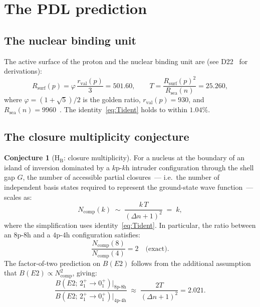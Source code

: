 \documentclass[11pt,a4paper]{article}
\theoremstyle{definition}
\newtheorem{conjecture}[theorem]{Conjecture}
\newcommand{\Rsurf}{R_{\mathrm{surf}}}
\newcommand{\Rsea}{R_{\mathrm{sea}}}
\newcommand{\rval}{r_{\mathrm{val}}}
\newcommand{\Dn}{\Delta n}
\newcommand{\Ncomp}{N_{\mathrm{comp}}}
\newcommand{\BE}[1]{B(E2;\,{2^+_1}\!\to\!{0^+_1})\big|_{#1}}
\newcommand{\Tpdl}{T}
\newcommand{\kph}{k\text{p-}k\text{h}}
\begin{document}
\section{The PDL prediction}
\label{sec:prediction}

\subsection{The nuclear binding unit}

The active surface of the proton and the nuclear binding unit are
(see D22~\cite{PDL_D22_2026} for derivations):
\begin{equation}
  \Rsurf(p) = \varphi\,\frac{\rval(p)}{3} = 501.60,
  \qquad
  \Tpdl = \frac{\Rsurf(p)^2}{\Rsea(n)} = 25.260,
  \label{eq:T}
\end{equation}
where $\varphi = (1+\sqrt{5})/2$ is the golden ratio, $\rval(p) = 930$, and
$\Rsea(n) = 9960$~\cite{PDL_D05_2026}. The identity~\eqref{eq:Tident}
holds to within $1.04\%$.

\subsection{The closure multiplicity conjecture}

\begin{conjecture}[H$_\mathrm{B}$: closure multiplicity]
\label{conj:HB}
For a nucleus at the boundary of an island of inversion dominated by a
$\kph$ intruder configuration through the shell gap $G$, the number of
accessible partial closures~--- i.e.\ the number of independent basis states
required to represent the ground-state wave function~--- scales as:
\begin{equation}
  \Ncomp(k)
  \;\sim\;
  \frac{k\,\Tpdl}{(\Dn+1)^2}
  \;=\; k,
  \label{eq:Ncomp}
\end{equation}
where the simplification uses identity~\eqref{eq:Tident}. In particular, the
ratio between an $8\mathrm{p}$-$8\mathrm{h}$ and a $4\mathrm{p}$-$4\mathrm{h}$
configuration satisfies:
\begin{equation}
  \frac{\Ncomp(8)}{\Ncomp(4)} = 2 \quad \text{(exact)}.
  \label{eq:Ncomp_ratio}
\end{equation}
The factor-of-two prediction on $B(E2)$ follows from the additional
assumption that $B(E2) \propto \Ncomp^2$, giving:
\begin{equation}
  \frac{\BE{8\mathrm{p}\text{-}8\mathrm{h}}}{\BE{4\mathrm{p}\text{-}4\mathrm{h}}}
  \;\approx\;
  \frac{2\Tpdl}{(\Dn+1)^2}
  = 2.021.
  \label{eq:BE2_pred}
\end{equation}
\end{conjecture}
\end{document}
